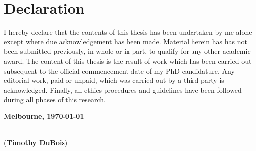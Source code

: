 \chapter{Declaration}

I hereby declare that the contents of this thesis has been undertaken by me alone except where due acknowledgement has been made. 
Material herein has has not been submitted previously, in whole or in part, to qualify for any other academic award. 
The content of this thesis is the result of work which has been carried out subsequent to the official commencement date of my PhD candidature. 
Any editorial work, paid or unpaid, which was carried out by a third party is acknowledged. Finally, all ethics procedures and guidelines have been followed during all phases of this research.


\textbf{Melbourne, \today}
\vspace{1.5cm}

\dotfill\hspace*{6.5cm}\\
\hspace*{2cm}(\textbf{Timothy DuBois}) %
